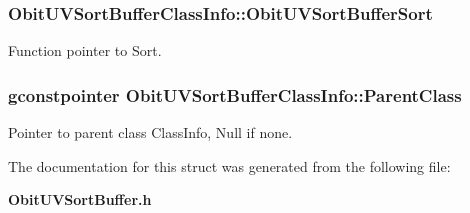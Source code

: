 \subsubsection{ {\bf Obit\-UVSort\-Buffer\-Class\-Info::Obit\-UVSort\-Buffer\-Sort}}\label{structObitUVSortBufferClassInfo_o17}


Function pointer to Sort. 

\subsubsection{\setlength{\rightskip}{0pt plus 5cm}gconstpointer {\bf Obit\-UVSort\-Buffer\-Class\-Info::Parent\-Class}}\label{structObitUVSortBufferClassInfo_o3}


Pointer to parent class Class\-Info, Null if none. 



The documentation for this struct was generated from the following file:\begin{CompactItemize}
\item 
{\bf Obit\-UVSort\-Buffer.h}\end{CompactItemize}
